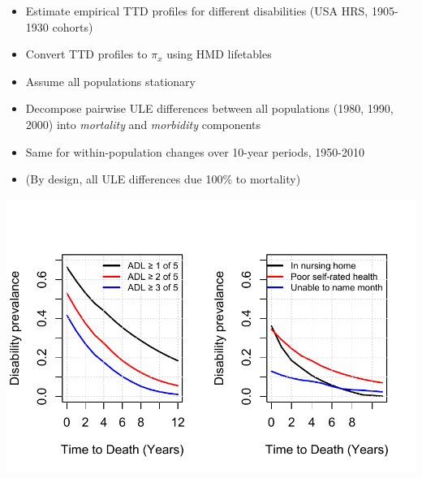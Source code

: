 \documentclass[20pt]{beamer}
\begin{document}
\begin{frame}[plain]
\Large
\begin{itemize}[<+->]
\item Estimate empirical TTD profiles for different disabilities (USA HRS, 1905-1930 cohorts)
\item Convert TTD profiles to $\pi_x$ using HMD lifetables
\item Assume all populations stationary
\item Decompose pairwise ULE differences between all populations (1980, 1990, 2000) into \emph{mortality} and \emph{morbidity} components
\item Same for within-population changes over 10-year periods, 1950-2010
\item (By design, all ULE differences due 100\% to mortality)
\end{itemize}
\end{frame}

\begin{frame}[plain]
\begin{center}
\includegraphics[scale=1.3]{Figures/DisbyTTD_pres.pdf}
\end{center}
\end{frame}
\end{document}

